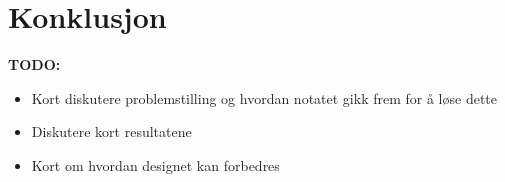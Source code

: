 \newpage
\section{Konklusjon}
\label{konklusjon}

\textbf{TODO:}
\begin{itemize}
    \item Kort diskutere problemstilling og hvordan notatet gikk frem for å løse dette
    \item Diskutere kort resultatene
    \item Kort om hvordan designet kan forbedres
\end{itemize}

